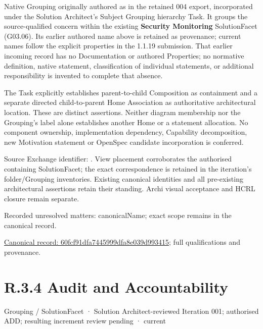 Native Grouping originally authored as \texttt{} in the retained 004 export,
incorporated under the Solution Architect's Subject Grouping hierarchy Task.
It groups the source-qualified \texttt{} concern within
the existing \textbf{Security Monitoring} SolutionFacet (G03.06). Its earlier authored name above is retained as provenance; current names
follow the explicit properties in the 1.1.19 submission.
That earlier incoming record has no Documentation or authored Properties; no normative
definition, native statement, classification of individual statements, or
additional responsibility is invented to complete that absence.



The Task explicitly establishes parent-to-child Composition as containment and
a separate directed child-to-parent Home Association as authoritative architectural
location. These are distinct assertions. Neither diagram membership nor the
Grouping's label alone establishes another Home or a statement allocation.
No component ownership, implementation dependency, Capability decomposition,
new Motivation statement or OpenSpec candidate incorporation is conferred.



Source Exchange identifier: \texttt{}. View placement corroborates
the authorised containing SolutionFacet; the exact correspondence is retained in the
iteration's folder/Grouping inventories. Existing canonical identities and all
pre-existing architectural assertions retain their standing. Archi visual
acceptance and HCRL closure remain separate.


{\small Recorded unresolved matters: canonicalName; exact scope remains in the canonical record.}\par
{\footnotesize \href{../../../../../../../continuum/grouping/60fcf91dfa7445999dfa8e039d993415.md}{Canonical record: 60fcf91dfa7445999dfa8e039d993415}; full qualifications and provenance.}\par
\section*{R.3.4 Audit and Accountability}
\label{navigation:R.3.4}

\label{element:abc27ddff6d644d9945db0cfd7488f07}
{\small Grouping / SolutionFacet · Solution Architect-reviewed Iteration 001; authorised ADD; resulting increment review pending · current}\par

